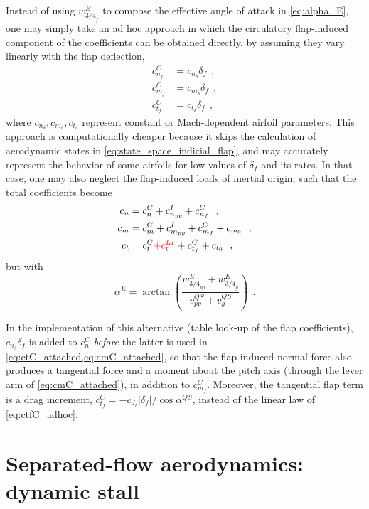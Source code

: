 \documentclass[12pt,a4paper,oneside,english]{abntex2} %
\newcommand{\fix}[1]{{\color{red}#1}}
\def\lp{\left(}
\def\rp{\right)}
\begin{document}
Instead of using $w_{{3/4}_f}^{E}$ to compose the effective angle of attack in \cref{eq:alpha_E}, one may simply take an ad hoc approach in which the circulatory flap-induced component of the coefficients can be obtained directly, by assuming they vary linearly with the flap deflection,
\begin{align}
    c_{n_f}^C &= c_{n_{\delta}}\delta_f \ \ ,
    \label{eq:cnfC_adhoc} 
    \\
    c_{m_f}^C &= c_{m_{\delta}}\delta_f \ \ ,
    \label{eq:cmfC_adhoc} 
    \\
    c_{t_f}^C &= c_{t_{\delta}}\delta_f \ \ ,
    \label{eq:ctfC_adhoc} 
\end{align}
where $c_{n_{\delta}},c_{m_{\delta}},c_{t_{\delta}}$ represent constant or Mach-dependent airfoil parameters. This approach is computationally cheaper because it skips the calculation of aerodynamic states in \cref{eq:state_space_indicial_flap}, and may accurately represent the behavior of some airfoils for low values of $\delta_f$ and its rates. In that case, one may also neglect the flap-induced loads of inertial origin, such that the total coefficients become
\begin{align}
    c_n &= c_n^C + c_{n_{pp}}^I + c_{n_f}^C \ \ ,
    \label{eq:cn_attached_alternative}
    \\
    c_m &= c_m^C + c_{m_{pp}}^I + c_{m_f}^C + c_{m_0} \ \ ,
    \label{eq:cm_attached_alternative}
    \\
    c_t &= c_t^C \fix{+ c_t^{LI}} + c_{t_f}^C + c_{t_0} \ \ ,
    \label{eq:ct_attached_alternative}
\end{align}
but with
\begin{equation}
    \alpha^E = \arctan{\lp\frac{w_{{3/4}_{pp}}^{E}+w_{{3/4}_g}^{E}}{v_{pp}^{QS}+v_g^{QS}}\rp} \ \ .
    \label{eq:alpha_E_alternative}
\end{equation}

\fix{In the implementation of this alternative (table look-up of the flap coefficients), $c_{n_{\delta}}\delta_f$ is added to $c_n^C$ \emph{before} the latter is used in \cref{eq:ctC_attached,eq:cmC_attached}, so that the flap-induced normal force also produces a tangential force and a moment about the pitch axis (through the lever arm of \cref{eq:cmC_attached}), in addition to $c_{m_f}^C$. Moreover, the tangential flap term is a drag increment, $c_{t_f}^C=-c_{d_{\delta}}|\delta_f|/\cos\alpha^{QS}$, instead of the linear law of \cref{eq:ctfC_adhoc}.}


\section{Separated-flow aerodynamics: dynamic stall}
\label{sec:dynamic_stall_model}
\end{document}
